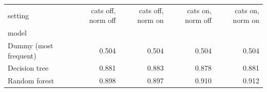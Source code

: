 \begin{tabular}{lrrrr}
\toprule
setting & cats off, norm off & cats off, norm on & cats on, norm off & cats on, norm on \\
model &  &  &  &  \\
\midrule
Dummy (most frequent) & 0.504 & 0.504 & 0.504 & 0.504 \\
Decision tree & 0.881 & 0.883 & 0.878 & 0.881 \\
Random forest & 0.898 & 0.897 & 0.910 & 0.912 \\
\bottomrule
\end{tabular}
